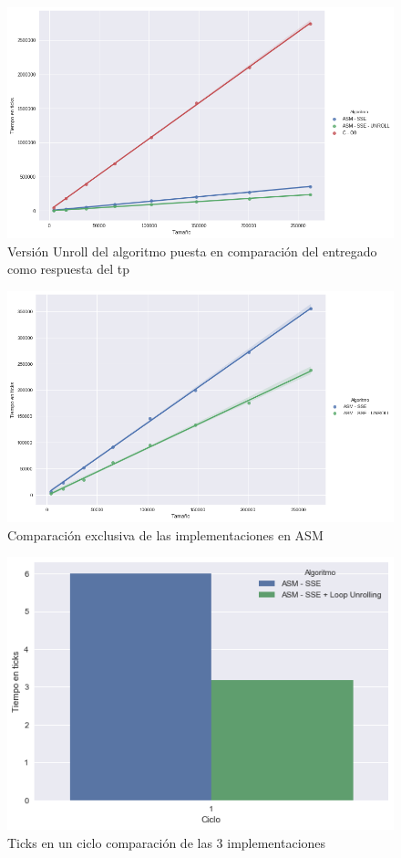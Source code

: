 \begin{figure}[H]
	\centering
	\includegraphics[scale=0.5]{img/fourCombine_UnrollvsNormal.png}
	\caption{Versión Unroll del algoritmo puesta en comparación del entregado como respuesta del tp}
	\label{sec:unroolvsnormal}
\end{figure}

\begin{figure}[H]
	\centering
	\includegraphics[scale=0.5]{img/fourCombine_UnrollvsNormal_asmOnly.png}
	\caption{Comparación exclusiva de las implementaciones en ASM}
	\label{sec:unroolvsnormal_asmOnly}
\end{figure}

\begin{figure}[H]
	\centering
	\includegraphics[scale=0.5]{img/fourCombine_ticks_en_ciclo.png}
	\caption{Ticks en un ciclo comparación de las 3 implementaciones}
	\label{sec:ticksciclo}
\end{figure}

